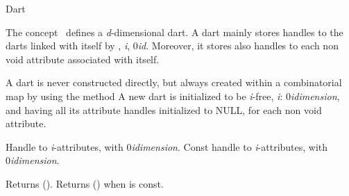 \ccRefPageBegin
\begin{ccRefConcept}{Dart}

\ccDefinition
  
The concept \ccRefName\ defines a \emph{d}-dimensional dart.  A dart mainly
stores handles to the darts linked with itself by \betai{}, \myforall{}\emph{i}, 
0\myleq{}\emph{i}\myleq{}\emph{d}. Moreover, it stores also handles to each
non void attribute associated with itself.


\ccCreation 
{} 
A dart  is never constructed directly, but always created
within a combinatorial map  by using the method
 A new dart is initialized to be \emph{i}-free,
\myforall{}\emph{i}: 0\myleq{}\emph{i}\myleq{}\emph{dimension}, and having all 
its attribute handles initialized to NULL, for each non void attribute.

\ccConstants
{}

\ccTypes
{}
%
\ccGlue
{}

    {Handle to \emph{i}-attributes, with 0\myleq{}\emph{i}\myleq{}\emph{dimension}.}
\ccGlue
{}
    {Const handle to \emph{i}-attributes, with 0\myleq{}\emph{i}\myleq{}\emph{dimension}.}

%
         {Returns \betai{}().
          }
\ccGlue
{}
         {Returns \betai{}() when  is const.
          }


\end{ccRefConcept}
